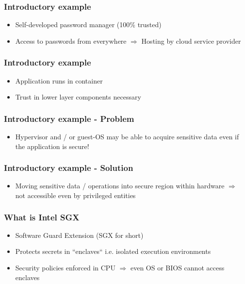 \begin{frame}
    \frametitle{Introductory example}
    \begin{itemize}
        \item Self-developed password manager (100\% trusted)
        \item Access to passwords from everywhere \newline$ \Rightarrow$ Hosting by cloud service provider
    \end{itemize}
    \centering
\end{frame}

\begin{frame}
    \frametitle{Introductory example}
    \begin{itemize}
        \item Application runs in container
        \item Trust in lower layer components necessary
    \end{itemize}
    \centering
\end{frame}

\begin{frame}
    \frametitle{Introductory example - Problem}
    \begin{itemize}
        \item Hypervisor and / or guest-OS may be able to acquire sensitive data even if the application is secure!
    \end{itemize}
    \centering
\end{frame}

\begin{frame}
    \frametitle{Introductory example - Solution}
    \begin{itemize}
        \item Moving sensitive data / operations into secure region within hardware \newline $\Rightarrow$ not accessible even by privileged entities
    \end{itemize}
    \centering
\end{frame}

\begin{frame}
    \frametitle{What is Intel SGX}
    \begin{itemize}
        \item Software Guard Extension (SGX for short)
        \item Protects secrets in ``enclaves`` i.e. isolated execution environments
        \item Security policies enforced in CPU $\Rightarrow$ even OS or BIOS cannot access enclaves
    \end{itemize}
\end{frame}


